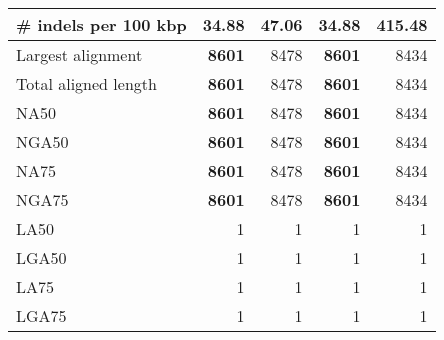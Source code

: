 \documentclass[12pt,a4paper]{article}
\begin{document}
\begin{table}[ht]
\begin{center}
\begin{tabular}{|l*{4}{|r}|}
\# indels per 100 kbp & {\bf 34.88} & 47.06 & {\bf 34.88} & 415.48 \\ \hline
Largest alignment & {\bf 8601} & 8478 & {\bf 8601} & 8434 \\ \hline
Total aligned length & {\bf 8601} & 8478 & {\bf 8601} & 8434 \\ \hline
NA50 & {\bf 8601} & 8478 & {\bf 8601} & 8434 \\ \hline
NGA50 & {\bf 8601} & 8478 & {\bf 8601} & 8434 \\ \hline
NA75 & {\bf 8601} & 8478 & {\bf 8601} & 8434 \\ \hline
NGA75 & {\bf 8601} & 8478 & {\bf 8601} & 8434 \\ \hline
LA50 & 1 & 1 & 1 & 1 \\ \hline
LGA50 & 1 & 1 & 1 & 1 \\ \hline
LA75 & 1 & 1 & 1 & 1 \\ \hline
LGA75 & 1 & 1 & 1 & 1 \\ \hline
\end{tabular}
\end{center}
\end{table}
\end{document}

